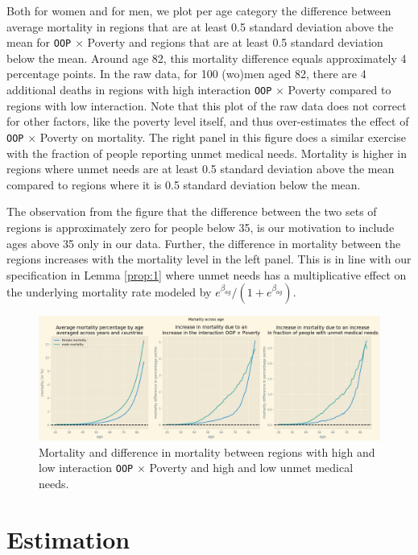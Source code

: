 \documentclass[a4paper,12pt]{article}
\begin{document}
Both for women and for men, we plot per age category the difference between average mortality in regions that are at least 0.5 standard deviation above the mean for \texttt{OOP} \(\times\) Poverty and regions that are at least 0.5 standard deviation below the mean. Around age 82, this mortality difference equals approximately 4 percentage points. In the raw data, for 100 (wo)men aged 82, there are 4 additional deaths in regions with high interaction \texttt{OOP} \(\times\) Poverty compared to regions with low interaction. Note that this plot of the raw data does not correct for other factors, like the poverty level itself, and thus over-estimates the effect of \texttt{OOP} \(\times\) Poverty on mortality. The right panel in this figure does a similar exercise with the fraction of people reporting unmet medical needs. Mortality is higher in regions where unmet needs are at least 0.5 standard deviation above the mean compared to regions where it is 0.5 standard deviation below the mean.

The observation from the figure that the difference between the two sets of regions is approximately zero for people below 35, is our motivation to include ages above 35 only in our data. Further, the difference in mortality between the regions increases with the mortality level in the left panel. This is in line with our specification in Lemma \ref{prop:1} where unmet needs has a multiplicative effect on the underlying mortality rate modeled by \(e^{\beta_{ag}}/(1+e^{\beta_{ag}})\).


\begin{figure}[htbp]
\centering
\includegraphics[width=.9\linewidth]{./figures/IncreaseMortalityInteractionData.png}
\caption{\label{fig:DifferenceMortalityData}Mortality and difference in mortality between regions with high and low interaction \texttt{OOP} \(\times\) Poverty and high and low unmet medical needs.}
\end{figure}



\section{Estimation}
\label{sec:orgbcb34b6}
\label{sec:estimation}
\end{document}
